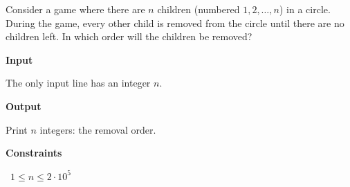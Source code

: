 Consider a game where there are $n$ children (numbered $1,2,\dots,n$) in a circle. During the game, every other child is removed from the circle until there are no children left. In which order will the children be removed?

\vspace{0.3cm}\noindent\textbf{Input}

The only input line has an integer $n$.

\vspace{0.3cm}\noindent\textbf{Output}

Print $n$ integers: the removal order.

\vspace{0.3cm}\noindent\textbf{Constraints}

\textbullet\ $1 \le n \le 2 \cdot 10^5$